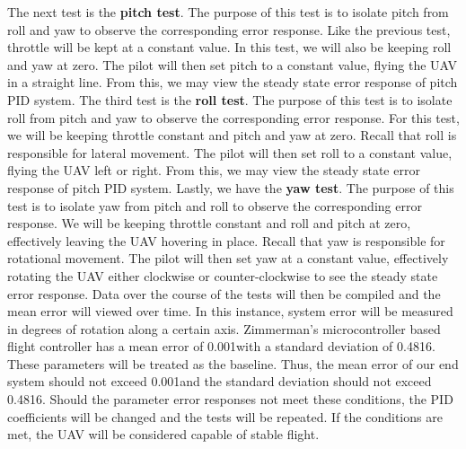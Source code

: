 \documentclass[english]{upeeei}
\begin{document}
\newline
\newline
The next test is the \textbf{pitch test}. The purpose of this test is to isolate pitch from roll and yaw to observe the corresponding
error response. Like the previous test, throttle will be kept at a constant value. In this test, we will also be keeping roll and yaw
at zero. The pilot will then set pitch to a constant value, flying the UAV in a straight line. From this, we may view the steady state error
response of pitch PID system.
\newline
\newline
The third test is the \textbf{roll test}. The purpose of this test is to isolate roll from pitch and yaw to observe the corresponding
error response. For this test, we will be keeping throttle constant and pitch and yaw at zero. Recall that roll is responsible for lateral
movement. The pilot will then set roll to a constant value, flying the UAV left or right. From this, we may view the steady state error 
response of pitch PID system.
\newline
\newline
Lastly, we have the \textbf{yaw test}. The purpose of this test is to isolate yaw from pitch and roll to observe the corresponding
error response. We will be keeping throttle constant and roll and pitch at zero, effectively leaving the UAV hovering in place. Recall that
yaw is responsible for rotational movement. The pilot will then set yaw at a constant value, effectively rotating the UAV either clockwise
or counter-clockwise to see the steady state error response.
\newline
\newline
Data over the course of the tests will then be compiled and the mean error will viewed over time. In this instance, system error 
will be measured in degrees of rotation along a certain axis. Zimmerman's microcontroller based
flight controller has a mean error of 0.001\textdegree with a standard deviation of 0.4816\textdegree. These parameters will be
treated as the baseline. Thus, the mean error of our end system should not exceed 0.001\textdegree and the standard deviation should 
not exceed 0.4816\textdegree. Should the parameter error responses not meet these conditions, the PID coefficients will be changed and the
tests will be repeated. If the conditions are met, the UAV will be considered capable of stable flight.
\end{document}
